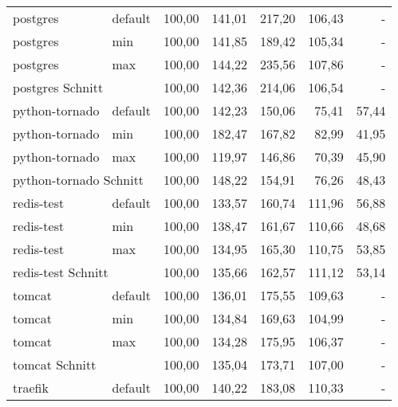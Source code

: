 \begin{footnotesize}
\begin{longtable}{llrrrrr}
		postgres                 & default         & 100,00 & 141,01 & 217,20  & 106,43                         & -     \\
		postgres                 & min             & 100,00 & 141,85 & 189,42  & 105,34                         & -     \\
		postgres                 & max             & 100,00 & 144,22 & 235,56  & 107,86                         & -     \\ \hline
		\multicolumn{2}{l}{postgres Schnitt}       & 100,00 & 142,36 & 214,06  & 106,54                         & -     \\ \hline
		python-tornado           & default         & 100,00 & 142,23 & 150,06  & 75,41                          & 57,44 \\
		python-tornado           & min             & 100,00 & 182,47 & 167,82  & 82,99                          & 41,95 \\
		python-tornado           & max             & 100,00 & 119,97 & 146,86  & 70,39                          & 45,90 \\ \hline
		\multicolumn{2}{l}{python-tornado Schnitt} & 100,00 & 148,22 & 154,91  & 76,26                          & 48,43 \\ \hline
		redis-test               & default         & 100,00 & 133,57 & 160,74  & 111,96                         & 56,88 \\
		redis-test               & min             & 100,00 & 138,47 & 161,67  & 110,66                         & 48,68 \\
		redis-test               & max             & 100,00 & 134,95 & 165,30  & 110,75                         & 53,85 \\ \hline
		\multicolumn{2}{l}{redis-test Schnitt}     & 100,00 & 135,66 & 162,57  & 111,12                         & 53,14 \\ \hline
		tomcat                   & default         & 100,00 & 136,01 & 175,55  & 109,63                         & -     \\
		tomcat                   & min             & 100,00 & 134,84 & 169,63  & 104,99                         & -     \\
		tomcat                   & max             & 100,00 & 134,28 & 175,95  & 106,37                         & -     \\ \hline
		\multicolumn{2}{l}{tomcat Schnitt}         & 100,00 & 135,04 & 173,71  & 107,00                         & -     \\ \hline
		traefik                  & default         & 100,00 & 140,22 & 183,08  & 110,33                         & -     \\

\end{longtable}
\end{footnotesize}
